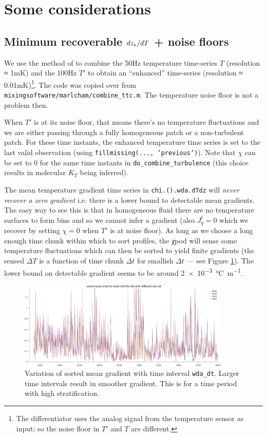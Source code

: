 \section{Some considerations}

\subsection{Minimum recoverable $dz_{*}/dT$ + noise floors}

We use the method of \cite{Mudge1994} to combine the 50Hz temperature time-series $T$ (resolution ≈ 1mK) and the 100Hz $T'$ to obtain an ``enhanced'' time-series (resolution ≈ 0.01mK)\footnote{The differentiator uses the analog signal from the temperature sensor as input; so the noise floor in $T'$ and $T$ are different.}.
The code was copied over from \texttt{mixingsoftware/marlcham/combine\_ttc.m}.
The temperature noise floor is not a problem then.

When $T'$ is at its noise floor, that means there's no temperature fluctuations and we are either passing through a fully homogeneous patch or a non-turbulent patch.
For these time instants, the enhanced temperature time series is set to the last valid observation (using \texttt{fillmissing(..., 'previous')}).
Note that $χ$ can be set to 0 for the same time instants in \texttt{do\_combine\_turbulence} (this choice results in molecular $K_T$ being inferred).

The mean temperature gradient time series in \texttt{chi.().wda.dTdz} will \emph{never recover a zero gradient} i.e. there is a lower bound to detectable mean gradients.
The easy way to see this is that in homogeneous fluid there are no temperature surfaces to form bins and so we cannot infer a gradient (also $J_q^t = 0$ which we recover by setting $χ=0$ when $T'$ is at noise floor).
As long as we choose a long enough time chunk within which to sort profiles, the χpod will sense some temperature fluctuations which can then be sorted to yield finite gradients (the sensed $ΔT$ is a function of time chunk $Δt$ for smallish $Δt$ --- see Figure \ref{fig:dTdz-dt}).
The lower bound on detectable gradient seems to be around \SI{2e-3}{\celsius\per\metre}.

\begin{figure}
  \centering
  \includegraphics[width=0.9\textwidth]{figs/wda-sorted-dTdz-dt-variation.png}
  \caption{Variation of sorted mean gradient with time interval \texttt{wda\_dt}. Larger time intervals result in smoother gradient. This is for a time period with high stratification.}
  \label{fig:dTdz-dt}
\end{figure}

